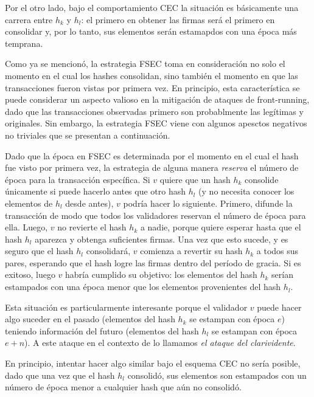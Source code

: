 Por el otro lado, bajo el comportamiento CEC la situación es básicamente una carrera entre $h_k$ y
$h_l$: el primero en obtener las \SPH firmas será el primero en consolidar y,
por lo tanto, sus elementos serán estamapdos con una época más temprana.
%

Como ya se mencionó, 
la estrategia FSEC toma en consideración no solo el momento en el cual los hashes consolidan, sino
también el momento en que las transacciones fueron vistas por primera vez.
%
En principio, esta característica se puede considerar un aspecto valioso en la mitigación de ataques
de front-running, dado que las transacciones observadas primero son probablmente las legítimas y
originales.
Sin embargo, la estrategia FSEC viene con algunos apesctos negativos no triviales que se presentan
a continuación.


Dado que la época en FSEC es determinada por el momento en el cual el hash fue visto por primera vez, 
la estrategia de alguna manera \textit{reserva} el número de época para la transacción específica.
Si $v$ quiere que un hash $h_k$ consolide únicamente si puede hacerlo antes que otro hash
$h_l$ (y no necesita conocer los elementos de $h_l$ desde antes), $v$ podría hacer lo siguiente.
%
Primero, difunde la transacción de modo que todos los validadores reservan el número de época para ella.
%
Luego, $v$ no revierte el hash $h_k$ a nadie, porque quiere esperar hasta que el hash $h_l$ aparezca
y obtenga suficientes firmas.
%
Una vez que esto sucede, y es seguro que el hash $h_l$ consolidará, $v$ comienza a revertir su hash
$h_k$ a todos sus pares, esperando que el hash logre las \SPH firmas dentro del período de gracia.
Si es exitoso, luego $v$ habría cumplido su objetivo: los elementos del hash $h_k$ serían estampados
con una época menor que los elementos provenientes del hash $h_l$.
%

Esta situación es particularmente interesante porque el validador $v$ puede hacer algo
suceder en el pasado (elementos del hash $h_k$ se estampan con época $e$) teniendo información
del futuro (elementos del hash $h_l$ se estampan con época $e+n$). A este ataque en el contexto
de \hashchain lo llamamos \textit{el ataque del clarividente}.
%

En principio, intentar hacer algo similar bajo el esquema CEC no sería posible, dado
que una vez que el hash $h_l$ consolidó, sus elementos son estampados con un número de época menor
a cualquier hash que aún no consolidó.
%

